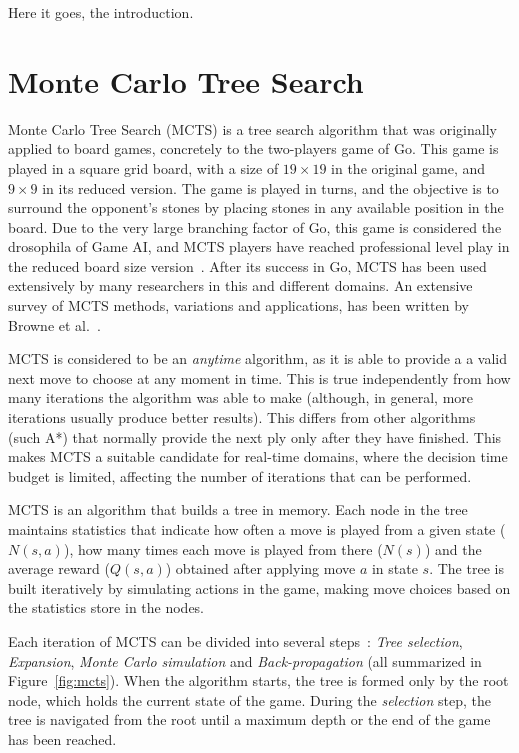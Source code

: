 \documentclass[journal]{IEEEtran}
\begin{document}
Here it goes, the introduction.

\section{Monte Carlo Tree Search} \label{sec:mcts}

Monte Carlo Tree Search (MCTS) is a tree search algorithm that was originally applied to board games, concretely to the two-players game of Go. This game is played in a square grid board, with a size of $19 \times 19$ in the original game, and $9 \times 9$ in its reduced version. The game is played in turns, and the objective is to surround the opponent's stones by placing stones in any available position in the board. Due to the very large branching factor of Go, this game is considered the drosophila of Game AI, and MCTS players have reached professional level play in the reduced board size version~\cite{Lee2009}. After its success in Go, MCTS has been used extensively by many researchers in this and different domains. An extensive survey of MCTS methods, variations and applications, has been written by Browne et al.~\cite{Browne2012}. 

MCTS is considered to be an \textit{anytime} algorithm, as it is able to provide a a valid next move to choose at any moment in time. This is true independently from how many iterations the algorithm was able to make (although, in general, more iterations usually produce better results). This differs from other algorithms (such A*) that normally provide the next ply only after they have finished. This makes MCTS a suitable candidate for real-time domains, where the decision time budget is limited, affecting the number of iterations that can be performed.

MCTS is an algorithm that builds a tree in memory. Each node in the tree maintains statistics that indicate how often a move is played from a given state ($N(s,a)$), how many times each move is played from there ($N(s)$) and the average reward ($Q(s,a)$) obtained after applying move $a$ in state $s$. The tree is built iteratively by simulating actions in the game, making move choices based on the statistics store in the nodes. 

Each iteration of MCTS can be divided into several steps~\cite{Gelly2006}: \textit{Tree selection}, \textit{Expansion}, \textit{Monte Carlo simulation} and \textit{Back-propagation} (all summarized in Figure~\ref{fig:mcts}). When the algorithm starts, the tree is formed only by the root node, which holds the current state of the game. During the \textit{selection} step, the tree is navigated from the root until a maximum depth or the end of the game has been reached. 
\end{document}
